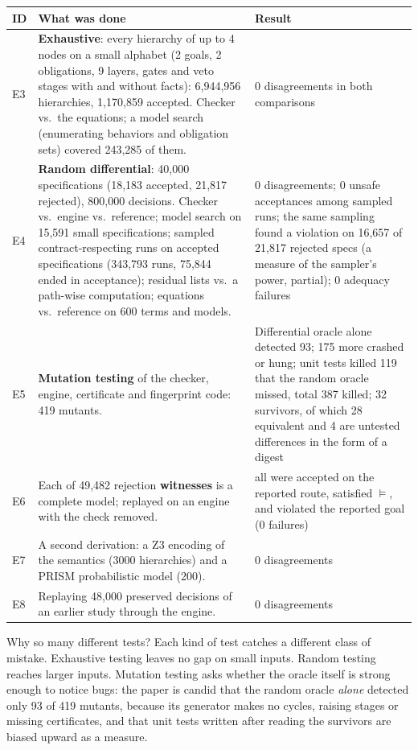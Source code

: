 \begin{center}
\renewcommand{\arraystretch}{1.25}
\footnotesize
\begin{tabularx}{\textwidth}{@{}lXX@{}}
\toprule
\textbf{ID} & \textbf{What was done} & \textbf{Result}\\
\midrule
E3 & \textbf{Exhaustive}: every hierarchy of up to 4 nodes on a small alphabet (2 goals, 2 obligations, 9 layers, gates and veto stages with and without facts): 6,944,956 hierarchies, 1,170,859 accepted. Checker vs.\ the equations; a model search (enumerating behaviors and obligation sets) covered 243,285 of them. & 0 disagreements in both comparisons\\[3pt]
E4 & \textbf{Random differential}: 40,000 specifications (18,183 accepted, 21,817 rejected), 800,000 decisions. Checker vs.\ engine vs.\ reference; model search on 15,591 small specifications; sampled contract-respecting runs on accepted specifications (343,793 runs, 75,844 ended in acceptance); residual lists vs.\ a path-wise computation; equations vs.\ reference on 600 terms and models. & 0 disagreements; 0 unsafe acceptances among sampled runs; the same sampling found a violation on 16,657 of 21,817 rejected specs (a measure of the sampler's power, partial); 0 adequacy failures\\[3pt]
E5 & \textbf{Mutation testing} of the checker, engine, certificate and fingerprint code: 419 mutants. & Differential oracle alone detected 93; 175 more crashed or hung; unit tests killed 119 that the random oracle missed, total 387 killed; 32 survivors, of which 28 equivalent and 4 are untested differences in the form of a digest\\[3pt]
E6 & Each of 49,482 rejection \textbf{witnesses} is a complete model; replayed on an engine with the check removed. & all were accepted on the reported route, satisfied $\models$, and violated the reported goal (0 failures)\\[3pt]
E7 & A second derivation: a Z3 encoding of the semantics (3000 hierarchies) and a PRISM probabilistic model (200). & 0 disagreements\\
E8 & Replaying 48,000 preserved decisions of an earlier study through the engine. & 0 disagreements\\
\bottomrule
\end{tabularx}
\end{center}

Why so many different tests? Each kind of test catches a different class of mistake. Exhaustive testing leaves no gap on small inputs. Random testing reaches larger inputs. Mutation testing asks whether the oracle itself is strong enough to notice bugs: the paper is candid that the random oracle \emph{alone} detected only 93 of 419 mutants, because its generator makes no cycles, raising stages or missing certificates, and that unit tests written after reading the survivors are biased upward as a measure.

